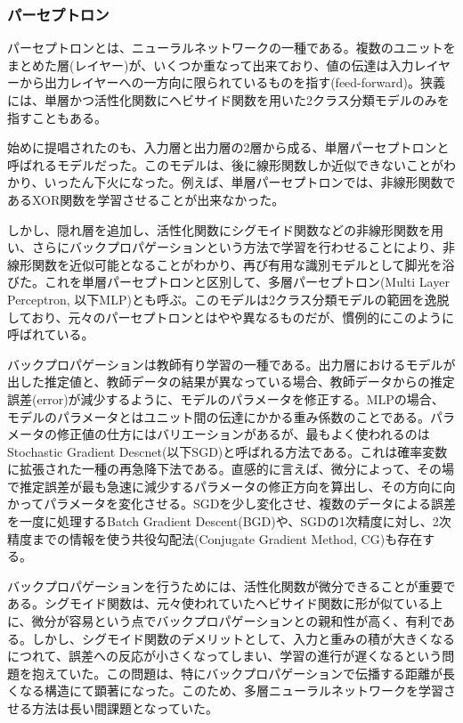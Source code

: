\subsubsection{パーセプトロン}
パーセプトロンとは、ニューラルネットワークの一種である。複数のユニットをまとめた層(レイヤー)が、いくつか重なって出来ており、値の伝達は入力レイヤーから出力レイヤーへの一方向に限られているものを指す(feed-forward)。狭義には、単層かつ活性化関数にヘビサイド関数を用いた2クラス分類モデルのみを指すこともある。\par
始めに提唱されたのも、入力層と出力層の2層から成る、単層パーセプトロンと呼ばれるモデルだった\cite{rosenblatt1958perceptron}。このモデルは、後に線形関数しか近似できないことがわかり、いったん下火になった\cite{minsky1988perceptrons:}。例えば、単層パーセプトロンでは、非線形関数であるXOR関数を学習させることが出来なかった。\par
しかし、隠れ層を追加し、活性化関数にシグモイド関数などの非線形関数を用い、さらにバックプロパゲーションという方法で学習を行わせることにより、非線形関数を近似可能となることがわかり、再び有用な識別モデルとして脚光を浴びた\cite{rumelhart1986learning}\cite{funahashi1989on-the-approximate}。これを単層パーセプトロンと区別して、多層パーセプトロン(Multi Layer Perceptron, 以下MLP)とも呼ぶ。このモデルは2クラス分類モデルの範囲を逸脱しており、元々のパーセプトロンとはやや異なるものだが、慣例的にこのように呼ばれている。\par
バックプロパゲーションは教師有り学習の一種である。出力層におけるモデルが出した推定値と、教師データの結果が異なっている場合、教師データからの推定誤差(error)が減少するように、モデルのパラメータを修正する。MLPの場合、モデルのパラメータとはユニット間の伝達にかかる重み係数のことである。パラメータの修正値の仕方にはバリエーションがあるが、最もよく使われるのはStochastic Gradient Descnet(以下SGD)と呼ばれる方法である。これは確率変数に拡張された一種の再急降下法である。直感的に言えば、微分によって、その場で推定誤差が最も急速に減少するパラメータの修正方向を算出し、その方向に向かってパラメータを変化させる。SGDを少し変化させ、複数のデータによる誤差を一度に処理するBatch Gradient Descent(BGD)や、SGDの1次精度に対し、2次精度までの情報を使う共役勾配法(Conjugate Gradient Method, CG)も存在する。\par
バックプロパゲーションを行うためには、活性化関数が微分できることが重要である。シグモイド関数は、元々使われていたヘビサイド関数に形が似ている上に、微分が容易という点でバックプロパゲーションとの親和性が高く、有利である。しかし、シグモイド関数のデメリットとして、入力と重みの積が大きくなるにつれて、誤差への反応が小さくなってしまい、学習の進行が遅くなるという問題を抱えていた。この問題は、特にバックプロパゲーションで伝播する距離が長くなる構造にて顕著になった\cite{hochreiter1998the-vanishing}\cite{hochreiter1998the-vanishing}。このため、多層ニューラルネットワークを学習させる方法は長い間課題となっていた。